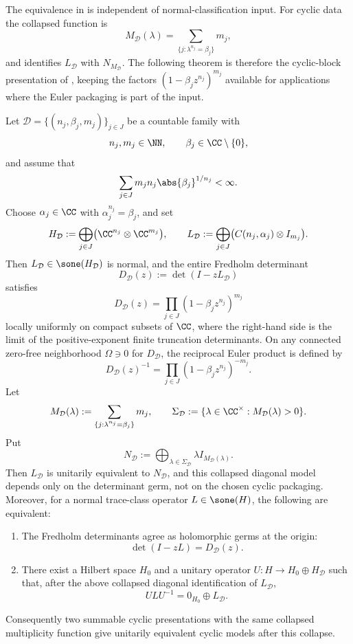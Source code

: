 The equivalence in  is independent
of normal-classification input. For cyclic data the collapsed function is
\[
  M_{\mathcal D}(\lambda)
  =\sum_{\{j:\lambda^{n_j}=\beta_j\}}m_j,
\]
and  identifies
\(L_{\mathcal D}\) with \(N_{M_{\mathcal D}}\). The following theorem is
therefore the cyclic-block presentation of
, keeping the factors
\((1-\beta_jz^{n_j})^{m_j}\) available for applications where the Euler
packaging is part of the input.

\begin{theorem}
  \label{thm:cyclic-fredholm-realization}
  Let \(\mathcal D=\{(n_j,\beta_j,m_j)\}_{j\in J}\) be a countable
  family with
  \[
    n_j,m_j\in\NN,\qquad
    \beta_j\in\CC\setminus\{0\},
  \]
  and assume that
  \[
    \sum_{j\in J}m_j n_j\abs{\beta_j}^{1/n_j}<\infty.
  \]
  Choose \(\alpha_j\in\CC\) with \(\alpha_j^{n_j}=\beta_j\), and set
  \[
    H_{\mathcal D}
    :=\bigoplus_{j\in J}\bigl(\CC^{n_j}\otimes\CC^{m_j}\bigr),
    \qquad
    L_{\mathcal D}
    :=\bigoplus_{j\in J}\bigl(C(n_j,\alpha_j)\otimes I_{m_j}\bigr).
  \]
  Then \(L_{\mathcal D}\in \sone(H_{\mathcal D})\) is normal, and the entire
  Fredholm determinant
  \[
    D_{\mathcal D}(z):=\det(I-zL_{\mathcal D})
  \]
  satisfies
  \[
    D_{\mathcal D}(z)
    =\prod_{j\in J}(1-\beta_j z^{n_j})^{m_j}
  \]
  locally uniformly on compact subsets of \(\CC\), where the right-hand
  side is the limit of the positive-exponent finite truncation determinants.
  On any connected zero-free neighborhood \(\Omega\ni0\) for
  \(D_{\mathcal D}\), the reciprocal Euler product is defined by
  \[
    D_{\mathcal D}(z)^{-1}
    =\prod_{j\in J}(1-\beta_j z^{n_j})^{-m_j}.
  \]
  Let
  \[
    M_{\mathcal D}(\lambda)
    :=\sum_{\{j:\lambda^{n_j}=\beta_j\}}m_j,
    \qquad
    \Sigma_{\mathcal D}:=\{\lambda\in\CC^\times:
      M_{\mathcal D}(\lambda)>0\}.
  \]
  Put
  \[
    N_{\mathcal D}:=
    \bigoplus_{\lambda\in\Sigma_{\mathcal D}}
      \lambda I_{M_{\mathcal D}(\lambda)} .
  \]
  Then \(L_{\mathcal D}\) is unitarily equivalent to
  \(N_{\mathcal D}\), and this collapsed diagonal model depends only on the
  determinant germ, not on the chosen cyclic packaging.  Moreover, for a
  normal trace-class operator \(L\in \sone(H)\), the following are
  equivalent:
  \begin{enumerate}[label=\textup{(\roman*)}]
    \item The Fredholm determinants agree as holomorphic germs at the
      origin:
      \[
        \det(I-zL)=D_{\mathcal D}(z).
      \]
    \item There exist a Hilbert space \(H_0\) and a unitary operator
      \(U:H\to H_0\oplus H_{\mathcal D}\) such that, after the above
      collapsed diagonal identification of \(L_{\mathcal D}\),
      \[
        ULU^{-1}=0_{H_0}\oplus L_{\mathcal D}.
      \]
  \end{enumerate}
  Consequently two summable cyclic presentations with the same collapsed
  multiplicity function give unitarily equivalent cyclic models after this
  collapse.
\end{theorem}

